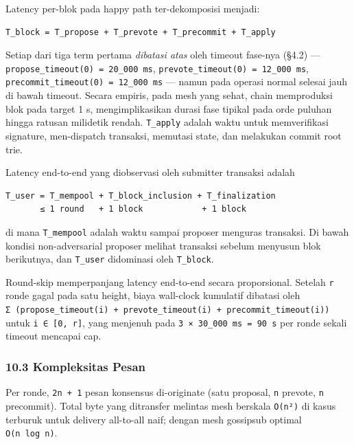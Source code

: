 \documentclass[11pt,a4paper]{article}
\begin{document}
Latency per-blok pada happy path ter-dekomposisi menjadi:

\begin{verbatim}
T_block = T_propose + T_prevote + T_precommit + T_apply
\end{verbatim}

Setiap dari tiga term pertama \emph{dibatasi atas} oleh timeout fase-nya (§4.2) --- \texttt{propose\_timeout(0)\ =\ 20\_000\ ms}, \texttt{prevote\_timeout(0)\ =\ 12\_000\ ms}, \texttt{precommit\_timeout(0)\ =\ 12\_000\ ms} --- namun pada operasi normal selesai jauh di bawah timeout. Secara empiris, pada mesh yang sehat, chain memproduksi blok pada target 1 s, mengimplikasikan durasi fase tipikal pada orde puluhan hingga ratusan milidetik rendah. \texttt{T\_apply} adalah waktu untuk memverifikasi signature, men-dispatch transaksi, memutasi state, dan melakukan commit root trie.

Latency end-to-end yang diobservasi oleh submitter transaksi adalah

\begin{verbatim}
T_user = T_mempool + T_block_inclusion + T_finalization
       ≤ 1 round   + 1 block            + 1 block
\end{verbatim}

di mana \texttt{T\_mempool} adalah waktu sampai proposer menguras transaksi. Di bawah kondisi non-adversarial proposer melihat transaksi sebelum menyusun blok berikutnya, dan \texttt{T\_user} didominasi oleh \texttt{T\_block}.

Round-skip memperpanjang latency end-to-end secara proporsional. Setelah \texttt{r} ronde gagal pada satu height, biaya wall-clock kumulatif dibatasi oleh \texttt{Σ\ (propose\_timeout(i)\ +\ prevote\_timeout(i)\ +\ precommit\_timeout(i))} untuk \texttt{i\ ∈\ {[}0,\ r{]}}, yang menjenuh pada \texttt{3\ ×\ 30\_000\ ms\ =\ 90\ s} per ronde sekali timeout mencapai cap.

\hypertarget{kompleksitas-pesan-1}{%
\subsubsection{10.3 Kompleksitas Pesan}\label{kompleksitas-pesan-1}}

Per ronde, \texttt{2n\ +\ 1} pesan konsensus di-originate (satu proposal, \texttt{n} prevote, \texttt{n} precommit). Total byte yang ditransfer melintas mesh berskala \texttt{O(n²)} di kasus terburuk untuk delivery all-to-all naif; dengan mesh gossipsub optimal \texttt{O(n\ log\ n)}.
\end{document}

